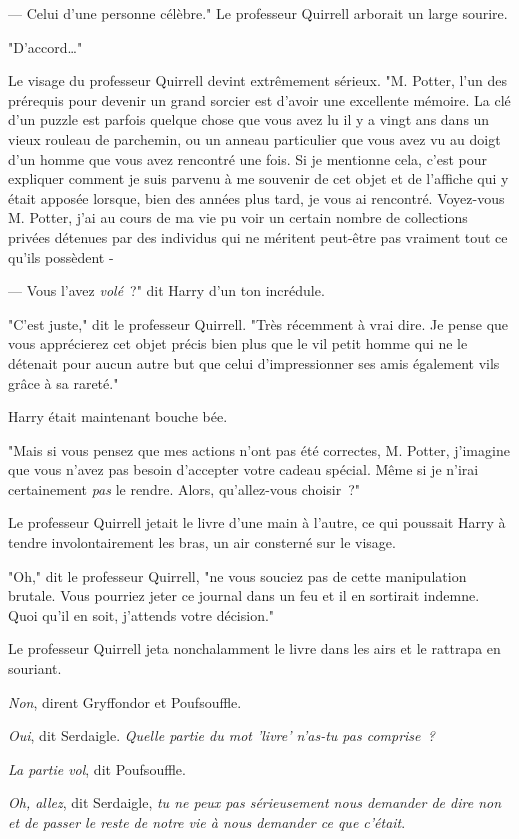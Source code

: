 --- Celui d'une personne célèbre." Le professeur Quirrell arborait un large sourire.

"D'accord…"

Le visage du professeur Quirrell devint extrêmement sérieux. "M. Potter, l'un des prérequis pour devenir un grand sorcier est d'avoir une excellente mémoire. La clé d'un puzzle est parfois quelque chose que vous avez lu il y a vingt ans dans un vieux rouleau de parchemin, ou un anneau particulier que vous avez vu au doigt d'un homme que vous avez rencontré une fois. Si je mentionne cela, c'est pour expliquer comment je suis parvenu à me souvenir de cet objet et de l'affiche qui y était apposée lorsque, bien des années plus tard, je vous ai rencontré. Voyez-vous M. Potter, j'ai au cours de ma vie pu voir un certain nombre de collections privées détenues par des individus qui ne méritent peut-être pas vraiment tout ce qu'ils possèdent -

--- Vous l'avez \emph{volé}~?" dit Harry d'un ton incrédule.

"C'est juste," dit le professeur Quirrell. "Très récemment à vrai dire. Je pense que vous apprécierez cet objet précis bien plus que le vil petit homme qui ne le détenait pour aucun autre but que celui d'impressionner ses amis également vils grâce à sa rareté."

Harry était maintenant bouche bée.

"Mais si vous pensez que mes actions n'ont pas été correctes, M. Potter, j'imagine que vous n'avez pas besoin d'accepter votre cadeau spécial. Même si je n'irai certainement \emph{pas} le rendre. Alors, qu'allez-vous choisir~?"

Le professeur Quirrell jetait le livre d'une main à l'autre, ce qui poussait Harry à tendre involontairement les bras, un air consterné sur le visage.

"Oh," dit le professeur Quirrell, "ne vous souciez pas de cette manipulation brutale. Vous pourriez jeter ce journal dans un feu et il en sortirait indemne. Quoi qu'il en soit, j'attends votre décision."

Le professeur Quirrell jeta nonchalamment le livre dans les airs et le rattrapa en souriant.

\emph{Non}, dirent Gryffondor et Poufsouffle.

\emph{Oui}, dit Serdaigle. \emph{Quelle partie du mot 'livre' n'as-tu pas comprise~?}

\emph{La partie vol}, dit Poufsouffle.

\emph{Oh, allez}, dit Serdaigle, \emph{tu ne peux pas sérieusement nous demander de dire non et de passer le reste de notre vie à nous demander ce que c'était}.

